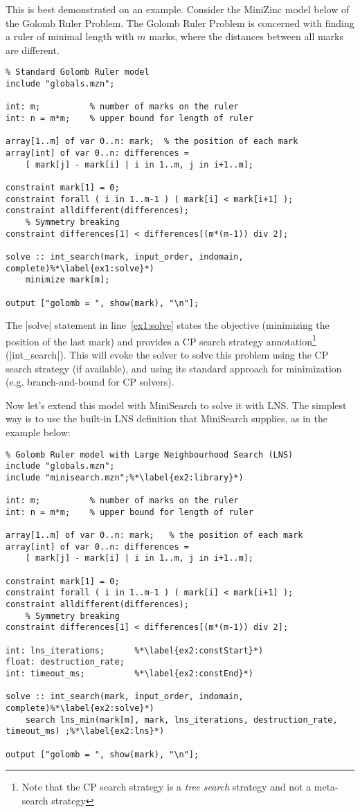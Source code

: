 \documentclass[a4paper,13pt,onecolumn]{article}%
\begin{document}
This is best demonstrated on an example. Consider the MiniZinc model below of the Golomb Ruler Problem.
The Golomb Ruler Problem is concerned with finding a ruler of minimal length with $m$ marks,
where the distances between all marks are different. 
\begin{lstlisting}
% Standard Golomb Ruler model
include "globals.mzn";

int: m;          % number of marks on the ruler
int: n = m*m;    % upper bound for length of ruler

array[1..m] of var 0..n: mark;  % the position of each mark
array[int] of var 0..n: differences =
    [ mark[j] - mark[i] | i in 1..m, j in i+1..m];

constraint mark[1] = 0;
constraint forall ( i in 1..m-1 ) ( mark[i] < mark[i+1] );
constraint alldifferent(differences);
    % Symmetry breaking
constraint differences[1] < differences[(m*(m-1)) div 2];

solve :: int_search(mark, input_order, indomain, complete)%*\label{ex1:solve}*)
    minimize mark[m];

output ["golomb = ", show(mark), "\n"];
\end{lstlisting}
The \mzninline|solve| statement in line~\ref{ex1:solve} states the
objective (minimizing the position of the last mark) and provides 
a CP search strategy annotation\footnote{Note that the CP search strategy is a {\em tree search} strategy and not a meta-search strategy} (\mzninline|int_search|).
This will evoke the solver to solve this problem using the CP search strategy 
(if available), and using its standard approach for minimization (e.g. branch-and-bound for CP solvers).

Now let's extend this model with MiniSearch to solve it with LNS.
The simplest way is to use the built-in LNS definition that MiniSearch supplies, as in the example below:
\begin{lstlisting}
% Golomb Ruler model with Large Neighbourhood Search (LNS)
include "globals.mzn";
include "minisearch.mzn";%*\label{ex2:library}*)

int: m;          % number of marks on the ruler
int: n = m*m;    % upper bound for length of ruler

array[1..m] of var 0..n: mark;   % the position of each mark
array[int] of var 0..n: differences =
    [ mark[j] - mark[i] | i in 1..m, j in i+1..m];

constraint mark[1] = 0;
constraint forall ( i in 1..m-1 ) ( mark[i] < mark[i+1] );
constraint alldifferent(differences);
    % Symmetry breaking
constraint differences[1] < differences[(m*(m-1)) div 2];

int: lns_iterations;      %*\label{ex2:constStart}*)
float: destruction_rate;  
int: timeout_ms;          %*\label{ex2:constEnd}*)

solve :: int_search(mark, input_order, indomain, complete)%*\label{ex2:solve}*)
    search lns_min(mark[m], mark, lns_iterations, destruction_rate, timeout_ms) ;%*\label{ex2:lns}*)

output ["golomb = ", show(mark), "\n"];
\end{lstlisting}
\end{document}
